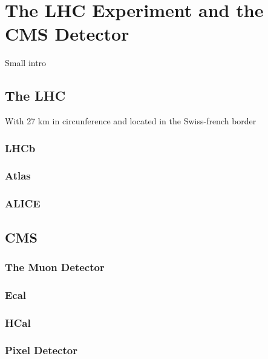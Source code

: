 
\chapter{The LHC Experiment and the CMS Detector}\label{ch:lhcandcms}

Small intro
\section{The LHC}
With 27 km in circunference and located in the Swiss-french border\cite{pix_tdr}
\subsection{LHCb}
\subsection{Atlas}
\subsection{ALICE}
\section{CMS}
\subsection{The Muon Detector}
\subsection{Ecal}
\subsection{HCal}
\subsection{Pixel Detector}




